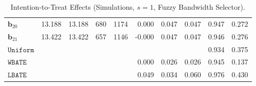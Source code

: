 \documentclass[10pt]{article}
\newcommand{\bb}{\mathbf{b}}
\begin{document}
\begin{table}[p]
\begin{tabular}{lccccrrrrr}
$\bb_{20}$ & 13.188 & 13.188 & 680 & 1174 & 0.000 & 0.047 & 0.047 & 0.947 & 0.272 \\
$\bb_{21}$ & 13.422 & 13.422 & 657 & 1146 & -0.000 & 0.047 & 0.047 & 0.946 & 0.276 \\
\midrule
$\mathtt{Uniform}$ &  &  &  &  &  &  &  & 0.934 & 0.375 \\
\midrule
$\mathtt{WBATE}$ &  &  &  &  & 0.000 & 0.026 & 0.026 & 0.945 & 0.137 \\
\midrule
$\mathtt{LBATE}$ &  &  &  &  & 0.049 & 0.034 & 0.060 & 0.976 & 0.430 \\
\bottomrule\bottomrule
\end{tabular}

    \caption{Intention-to-Treat Effects (Simulations, $s=1$, Fuzzy Bandwidth Selector).}
    \label{tab:sa-simuls-itt-s1-bwmain}
\end{table}
\end{document}
